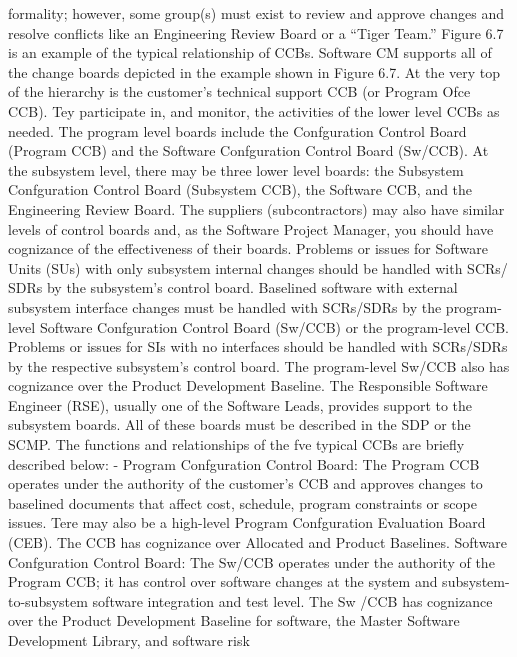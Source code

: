 \documentclass[twocolumn,a4paper,13pt]{book}
\begin{document}
formality; however, some group(s) must exist to review and
approve changes and resolve conﬂicts like an Engineering
Review Board or a “Tiger Team.” Figure 6.7 is an example of
the typical relationship of CCBs.
Software CM supports all of the change boards depicted
in the example shown in Figure 6.7. At the very top of the hierarchy is the customer’s technical support CCB (or
Program Ofce CCB). Tey participate in, and monitor, the
activities of the lower level CCBs as needed.
The program level boards include the Confguration
Control Board (Program CCB) and the Software
Confguration Control Board (Sw/CCB). At the subsystem
level, there may be three lower level boards: the Subsystem
Confguration Control Board (Subsystem CCB), the
Software CCB, and the Engineering Review Board. The suppliers (subcontractors) may also have similar levels of control
boards and, as the Software Project Manager, you should
have cognizance of the eﬀectiveness of their boards.
Problems or issues for Software Units (SUs) with only
subsystem internal changes should be handled with SCRs/
SDRs by the subsystem’s control board. Baselined software with external subsystem interface changes must be
handled with SCRs/SDRs by the program-level Software
Confguration Control Board (Sw/CCB) or the program-level
CCB. Problems or issues for SIs with no interfaces should be
handled with SCRs/SDRs by the respective subsystem’s control board. The program-level Sw/CCB also has cognizance
over the Product Development Baseline.
The Responsible Software Engineer (RSE), usually one
of the Software Leads, provides support to the subsystem
boards. All of these boards must be described in the SDP or
the SCMP. The functions and relationships of the fve typical
CCBs are brieﬂy described below:
- Program Confguration Control Board: The Program
CCB operates under the authority of the customer’s
CCB and approves changes to baselined documents
that aﬀect cost, schedule, program constraints or
scope issues. Tere may also be a high-level Program
Confguration Evaluation Board (CEB). The CCB has
cognizance over Allocated and Product Baselines.
 Software Confguration Control Board: The Sw/CCB
operates under the authority of the Program CCB; it
has control over software changes at the system and
subsystem-to-subsystem 
software integration and test
level. The Sw /CCB has cognizance over the Product
Development Baseline for software, the Master
Software Development Library, and software risk
\end{document}
